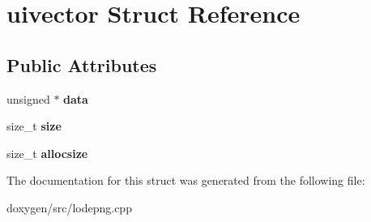 \hypertarget{structuivector}{}\section{uivector Struct Reference}
\label{structuivector}
\subsection*{Public Attributes}
\begin{DoxyCompactItemize}
\item 
\mbox{\label{structuivector_a427d761df4bb4f0f19b4a973fc224c78}} 
unsigned $\ast$ {\bfseries data}
\item 
\mbox{\label{structuivector_aa999025945f0c93d0461192475ae2720}} 
size\+\_\+t {\bfseries size}
\item 
\mbox{\label{structuivector_aac0395a9ad397ae7a28219561ab49ffa}} 
size\+\_\+t {\bfseries allocsize}
\end{DoxyCompactItemize}


The documentation for this struct was generated from the following file\+:\begin{DoxyCompactItemize}
\item 
doxygen/src/lodepng.\+cpp\end{DoxyCompactItemize}
